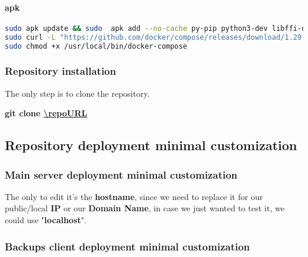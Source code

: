 \paragraph{apk}
\begin{flushleft}
\begin{lstlisting}[language=bash,label={lst:apk-compose}]
sudo apk update && sudo  apk add --no-cache py-pip python3-dev libffi-dev openssl-dev gcc libc-dev rust cargo make
sudo curl -L "https://github.com/docker/compose/releases/download/1.29.2/docker-compose-$(uname -s)-$(uname -m)" -o /usr/local/bin/docker-compose
sudo chmod +x /usr/local/bin/docker-compose\end{lstlisting}
\end{flushleft}


\subsubsection{Repository installation}\label{subsubsec:repo-installation}
\begin{flushleft}
    The only step is to clone the repository.
    \begin{flushleft}
        \textbf{git clone \url{\repoURL}}
    \end{flushleft}
\end{flushleft}




\subsection{Repository deployment minimal customization}\label{subsec:repo-customization}
\subsubsection[Main server deployment minimal customization]{Main server deployment minimal customization}

\begin{flushleft}
    The only to edit it's the \textbf{hostname}, since we need to replace it for our public/local \textbf{IP}
    or our \textbf{Domain Name}, in case we just wanted to test it, we could use "\textbf{localhost}".
\end{flushleft}

\newpage
\subsubsection[Backups client deployment minimal customization]{Backups client deployment minimal customization}
